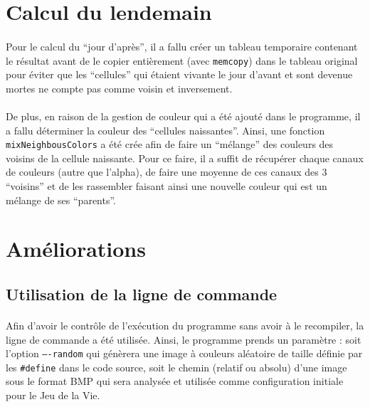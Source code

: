 \documentclass{report}
\begin{document}
\section{Calcul du lendemain}

\paragraph{} Pour le calcul du ``jour d'après'', il a fallu créer un tableau
temporaire contenant le résultat avant de le copier entièrement (avec
\lstinline[style=prog]|memcopy|) dans le tableau original pour éviter que les
``cellules'' qui étaient vivante le jour d'avant et sont devenue mortes ne
compte pas comme voisin et inversement.

\paragraph{} De plus, en raison de la gestion de couleur qui a été ajouté dans
le programme, il a fallu déterminer la couleur des ``cellules naissantes''.
Ainsi, une fonction \lstinline[style=prog]|mixNeighbousColors| a été crée afin
de faire un ``mélange'' des couleurs des voisins de la cellule naissante. Pour
ce faire, il a suffit de récupérer chaque canaux de couleurs (autre que
l'alpha), de faire une moyenne de ces canaux des 3 ``voisins'' et de les
rassembler faisant ainsi une nouvelle couleur qui est un mélange de ses
``parents''.

\section{Améliorations}

\subsection{Utilisation de la ligne de commande}

\paragraph{} Afin d'avoir le contrôle de l'exécution du programme sans avoir à
le recompiler, la ligne de commande a été utilisée. Ainsi, le programme prends
un paramètre : soit l'option \texttt{----random} qui génèrera une image à
couleurs aléatoire de taille définie par les \lstinline[style=prog]|#define|
dans le code source, soit le chemin (relatif ou absolu) d'une image sous le
format BMP qui sera analysée et utilisée comme configuration initiale pour le
Jeu de la Vie.
\end{document}

